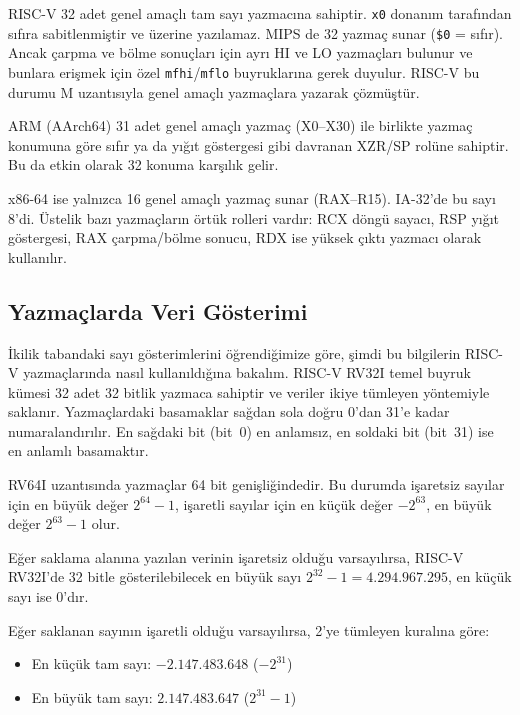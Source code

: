 \begin{karsilastirma}
RISC-V 32 adet genel amaçlı tam sayı yazmacına sahiptir. \texttt{x0} donanım tarafından sıfıra sabitlenmiştir ve üzerine yazılamaz. MIPS de 32 yazmaç sunar (\texttt{\$0} = sıfır). Ancak çarpma ve bölme sonuçları için ayrı HI ve LO yazmaçları bulunur ve bunlara erişmek için özel \texttt{mfhi}/\texttt{mflo} buyruklarına gerek duyulur. RISC-V bu durumu M uzantısıyla genel amaçlı yazmaçlara yazarak çözmüştür.

ARM (AArch64) 31 adet genel amaçlı yazmaç (X0--X30) ile birlikte yazmaç konumuna göre sıfır ya da yığıt göstergesi gibi davranan XZR/SP rolüne sahiptir. Bu da etkin olarak 32 konuma karşılık gelir.

x86-64 ise yalnızca 16 genel amaçlı yazmaç sunar (RAX--R15). IA-32'de bu sayı 8'di. Üstelik bazı yazmaçların örtük rolleri vardır: RCX döngü sayacı, RSP yığıt göstergesi, RAX çarpma/bölme sonucu, RDX ise yüksek çıktı yazmacı olarak kullanılır.
\end{karsilastirma}

\subsection{Yazmaçlarda Veri Gösterimi}
\label{sec:riscv-veri}

İkilik tabandaki sayı gösterimlerini öğrendiğimize göre, şimdi bu bilgilerin RISC-V yazmaçlarında nasıl kullanıldığına bakalım. RISC-V RV32I temel buyruk kümesi 32 adet 32 bitlik yazmaca sahiptir ve veriler ikiye tümleyen yöntemiyle saklanır. Yazmaçlardaki basamaklar sağdan sola doğru 0'dan 31'e kadar numaralandırılır. En sağdaki bit (bit~0) en anlamsız, en soldaki bit (bit~31) ise en anlamlı basamaktır.

\begin{bilginot}
RV64I uzantısında yazmaçlar 64 bit genişliğindedir. Bu durumda işaretsiz sayılar için en büyük değer $2^{64}-1$, işaretli sayılar için en küçük değer $-2^{63}$, en büyük değer $2^{63}-1$ olur.
\end{bilginot}

Eğer saklama alanına yazılan verinin işaretsiz olduğu varsayılırsa, RISC-V RV32I'de 32 bitle gösterilebilecek en büyük sayı $2^{32}-1 = 4.294.967.295$, en küçük sayı ise $0$'dır.

Eğer saklanan sayının işaretli olduğu varsayılırsa, 2'ye tümleyen kuralına göre:
\begin{itemize}
\item En küçük tam sayı: $-2.147.483.648$ ($-2^{31}$)
\item En büyük tam sayı: $2.147.483.647$ ($2^{31}-1$)
\end{itemize}

